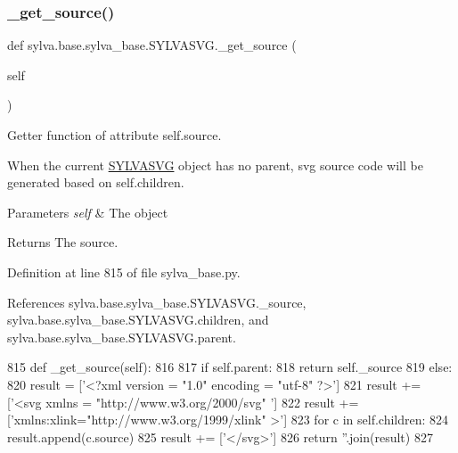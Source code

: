 \subsubsection{\texorpdfstring{\+\_\+get\+\_\+source()}{\_get\_source()}}
{\footnotesize\ttfamily def sylva.\+base.\+sylva\+\_\+base.\+S\+Y\+L\+V\+A\+S\+V\+G.\+\_\+get\+\_\+source (\begin{DoxyParamCaption}\item[{}]{self }\end{DoxyParamCaption})\hspace{0.3cm}{\ttfamily [private]}}



Getter function of attribute self.\+source. 

When the current \hyperlink{classsylva_1_1base_1_1sylva__base_1_1_s_y_l_v_a_s_v_g}{S\+Y\+L\+V\+A\+S\+VG} object has no parent, svg source code will be generated based on self.\+children.


\begin{DoxyParams}{Parameters}
{\em self} & The object\\
\hline
\end{DoxyParams}
\begin{DoxyReturn}{Returns}
The source. 
\end{DoxyReturn}


Definition at line 815 of file sylva\+\_\+base.\+py.



References sylva.\+base.\+sylva\+\_\+base.\+S\+Y\+L\+V\+A\+S\+V\+G.\+\_\+source, sylva.\+base.\+sylva\+\_\+base.\+S\+Y\+L\+V\+A\+S\+V\+G.\+children, and sylva.\+base.\+sylva\+\_\+base.\+S\+Y\+L\+V\+A\+S\+V\+G.\+parent.


\begin{DoxyCode}
815     \textcolor{keyword}{def }\_get\_source(self):
816 
817         \textcolor{keywordflow}{if} self.parent:
818             \textcolor{keywordflow}{return} self.\_source
819         \textcolor{keywordflow}{else}:
820             result = [\textcolor{stringliteral}{'<?xml version = "1.0" encoding = "utf-8" ?>'}]
821             result += [\textcolor{stringliteral}{'<svg xmlns = "http://www.w3.org/2000/svg" '}]
822             result += [\textcolor{stringliteral}{'xmlns:xlink="http://www.w3.org/1999/xlink" >'}]
823             \textcolor{keywordflow}{for} c \textcolor{keywordflow}{in} self.children:
824                 result.append(c.source)
825             result += [\textcolor{stringliteral}{'</svg>'}]
826             \textcolor{keywordflow}{return} \textcolor{stringliteral}{''}.join(result)
827 
\end{DoxyCode}
\mbox{\label{classsylva_1_1base_1_1sylva__base_1_1_s_y_l_v_a_s_v_g_af0aa37478ec3ba1167ae2cc18cdd12b8}} 
